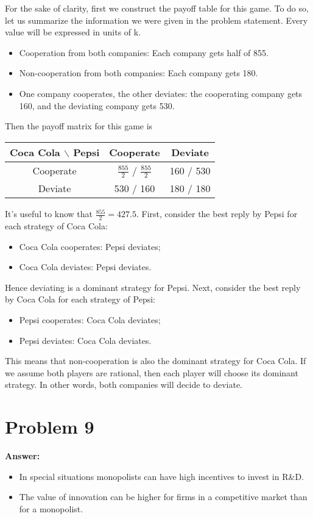 \documentclass[11pt]{article}
\begin{document}
For the sake of clarity, first we construct the payoff table for this game.
To do so, let us summarize the information we were given in the problem
statement. Every value will be expressed in units of  k.
\begin{itemize}
\item Cooperation from both companies: Each company gets half of 855.
\item Non-cooperation from both companies: Each company gets 180.
\item One company cooperates, the other deviates: the cooperating company gets
160, and the deviating company gets 530.
\end{itemize}
Then the payoff matrix for this game is
\begin{center}
\begin{tabular}{|c|c|c|}
\hline
Coca Cola $\backslash$ Pepsi & Cooperate & Deviate\\
\hline
Cooperate & \(\frac{855}{2}\) / \(\frac{855}{2}\) & 160 / 530\\
Deviate & 530 / 160 & 180 / 180\\
\hline
\end{tabular}
\end{center}
It's useful to know that \(\frac{855}{2}=427.5\). First, consider the
best reply by Pepsi for each strategy of Coca Cola:
\begin{itemize}
\item Coca Cola cooperates: Pepsi deviates;
\item Coca Cola deviates: Pepsi deviates.
\end{itemize}
Hence deviating is a dominant strategy for Pepsi. Next, consider the best
reply by Coca Cola for each strategy of Pepsi:
\begin{itemize}
\item Pepsi cooperates: Coca Cola deviates;
\item Pepsi deviates: Coca Cola deviates.
\end{itemize}
This means that non-cooperation is also the dominant strategy for Coca
Cola. If we assume both players are rational, then each player will choose
its dominant strategy. In other words, both companies will decide to
deviate.
\section*{Problem 9}
\label{sec:org6a9f733}

\textbf{Answer:}
\begin{itemize}
\item In special situations monopolists can have high incentives to invest in
R\&D.
\item The value of innovation can be higher for firms in a competitive market
than for a monopolist.
\end{itemize}
\end{document}
